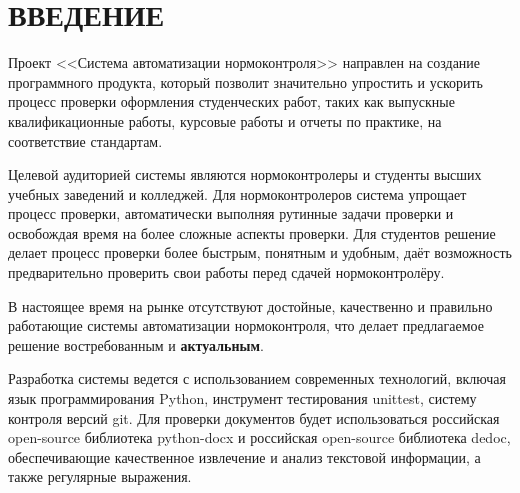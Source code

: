 \documentclass{report}
\begin{document}



\setcounter{page}{2} %
\tableofcontents  %

\setcounter{chapter}{0} %
\setcounter{section}{0} %
\setcounter{subsection}{0} %
\setcounter{equation}{0} %


\chapter*{ВВЕДЕНИЕ} %

Проект <<Система автоматизации нормоконтроля>> направлен на создание программного продукта, который позволит значительно упростить и ускорить процесс проверки оформления студенческих работ, таких как выпускные квалификационные работы, курсовые работы и отчеты по практике, на соответствие стандартам. 

Целевой аудиторией системы являются нормоконтролеры и студенты высших учебных заведений и колледжей. Для нормоконтролеров система упрощает процесс проверки, автоматически выполняя рутинные задачи проверки и освобождая время на более сложные аспекты проверки. Для студентов решение делает процесс проверки более быстрым, понятным и удобным, даёт возможность предварительно проверить свои работы перед сдачей нормоконтролёру. 

В настоящее время на рынке отсутствуют достойные, качественно и правильно работающие системы автоматизации нормоконтроля, что делает предлагаемое решение востребованным и \textbf{актуальным}.

Разработка системы ведется с использованием современных технологий, включая язык программирования Python, инструмент тестирования unittest, систему контроля версий git. Для проверки документов будет использоваться российская open-source библиотека python-docx и российская open-source библиотека dedoc, обеспечивающие качественное извлечение и анализ текстовой информации, а также регулярные выражения.
\end{document}

